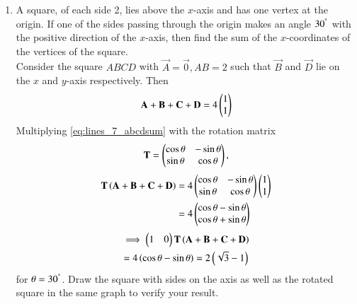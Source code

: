 \documentclass[journal,12pt,twocolumn]{IEEEtran}
\begin{document}
\begin{enumerate}[label=\arabic*]
\item A square, of each side 2, lies above the $x$-axis and has one vertex at the origin.  If one of the sides 
passing through the origin makes an angle $30^{\degree}$ with the positive direction of the $x$-axis, then 
find the 
sum of the $x$-coordinates of the vertices of the square.
\\
\solution Consider the square $ABCD$ with $\vec{A} = \vec{0}, AB = 2$ such that $\vec{B}$ and $\vec{D}$ lie on the $x$ and $y$-axis respectively. Then 
\begin{align}
\mathbf{A}+\mathbf{B}+\mathbf{C}+\mathbf{D} = 4\begin{pmatrix}1 \\ 1\end{pmatrix}
\label{eq:lines_7_abcdsum}
\end{align}
%
Multiplying \eqref{eq:lines_7_abcdsum} with the rotation matrix 
\begin{align}
\label{eq:lines_7_t}
\mathbf{T} = \begin{pmatrix}\cos \theta & -\sin \theta \\ \sin \theta & \cos \theta\end{pmatrix},
\end{align}
\begin{align}
\mathbf{T}\left(\mathbf{A}+\mathbf{B}+\mathbf{C}+\mathbf{D}\right) &= 4\begin{pmatrix}\cos \theta & -\sin \theta \\ \sin \theta & \cos \theta\end{pmatrix}\begin{pmatrix}1 \\ 1\end{pmatrix}
\nonumber \\
&= 4\begin{pmatrix}\cos \theta  -\sin \theta \\ \cos \theta + \sin \theta\end{pmatrix}
\end{align}
\begin{multline}
\implies \begin{pmatrix}1 & 0\end{pmatrix}\mathbf{T}\left(\mathbf{A}+\mathbf{B}+\mathbf{C}+\mathbf{D}\right) 
\\
= 4\left(\cos \theta  -\sin \theta\right)
= 2\left(\sqrt{3}-1\right)
\end{multline}
%
for $\theta = 30^{\degree}$. Draw the square with sides on the axis as well as the rotated square in the same graph to verify your result.



\end{enumerate}
\end{document}
